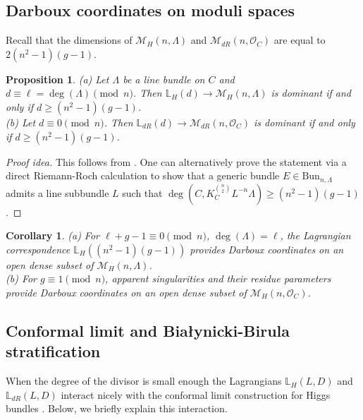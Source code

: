 \documentclass[twoside, 11pt]{article}
\numberwithin{equation}{section}
\theoremstyle{theorem}
\numberwithin{theorem}{section}
\newtheorem{proposition}[proposition]{Proposition}
\newtheorem{corollary}[corollary]{Corollary}
\theoremstyle{definition}
\begin{document}
\subsection{Darboux coordinates on moduli spaces}
Recall that the dimensions of $\mathcal{M}_H(n, \Lambda)$ and $\mathcal{M}_{dR}(n, \mathcal{O}_C)$ are equal to $2 (n^2-1)(g-1)$. 

\begin{proposition}
(a) Let $\Lambda$ be a line bundle on $C$ and $d \equiv \ell = \deg(\Lambda) \pmod{n}$. 
Then $\mathbb{L}_H(d) \rightarrow \mathcal{M}_H(n, \Lambda)$ is dominant if and only if $d \geq (n^2-1)(g-1)$. 
\\
(b) Let $d \equiv 0 \pmod{n}$. 
Then $\mathbb{L}_{dR}(d) \rightarrow \mathcal{M}_{dR}(n, \mathcal{O}_C)$ is dominant if and only if $d \geq (n^2-1)(g-1)$. 
\end{proposition}

\begin{proof}[Proof idea]
This follows from \cite{yoshi97}. One can alternatively prove the statement via a direct Riemann-Roch calculation to show that a generic bundle $E \in \mathrm{Bun}_{n, \Lambda}$ admits a line subbundle $L$ such that $\deg(C, K_C^{n \choose 2} L^{-n} \Lambda) \geq (n^2-1)(g-1)$.
\end{proof}

\begin{corollary}
(a) For $\ell + g - 1 \equiv 0 \pmod{n}$, $\deg(\Lambda) = \ell$, the Lagrangian correspondence $\mathbb{L}_H((n^2-1)(g-1))$ provides Darboux coordinates on an open dense subset of $\mathcal{M}_H(n, \Lambda)$.
\\
(b) For $g \equiv 1 \pmod{n}$, apparent singularities and their residue parameters provide Darboux coordinates on an open dense subset of $\mathcal{M}_H(n, \mathcal{O}_C)$.
\end{corollary}

\subsection{Conformal limit and Bia\l ynicki-Birula stratification}
\label{sect-CL}

When the degree of the divisor is small enough the Lagrangians $\mathbb L_H(L,D)$ and $\mathbb L_{dR}(L,D)$ interact nicely with the conformal limit construction for Higgs bundles \cite{CW18}. Below, we briefly explain this interaction. 
\end{document}
